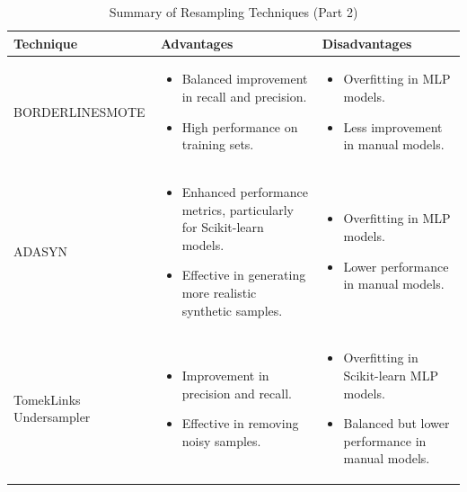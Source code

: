 \documentclass[a4paper,12pt]{article}
\begin{document}
\begin{table}[h!]
    \centering
    \caption{Summary of Resampling Techniques (Part 2)}
    \begin{tabularx}{\textwidth}{|l|X|X|}
    \hline
    \textbf{Technique} & \textbf{Advantages} & \textbf{Disadvantages} \\
    \hline
    BORDERLINESMOTE & 
    \begin{itemize}
        \item Balanced improvement in recall and precision.
        \item High performance on training sets.
    \end{itemize} & 
    \begin{itemize}
        \item Overfitting in MLP models.
        \item Less improvement in manual models.
    \end{itemize} \\
    \hline
    ADASYN & 
    \begin{itemize}
        \item Enhanced performance metrics, particularly for Scikit-learn models.
        \item Effective in generating more realistic synthetic samples.
    \end{itemize} & 
    \begin{itemize}
        \item Overfitting in MLP models.
        \item Lower performance in manual models.
    \end{itemize} \\
    \hline
    TomekLinks Undersampler & 
    \begin{itemize}
        \item Improvement in precision and recall.
        \item Effective in removing noisy samples.
    \end{itemize} & 
    \begin{itemize}
        \item Overfitting in Scikit-learn MLP models.
        \item Balanced but lower performance in manual models.
    \end{itemize} \\
    \hline
    \end{tabularx}
\end{table}
\end{document}
